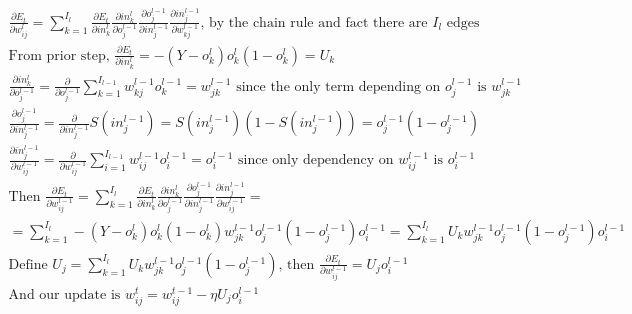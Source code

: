 \documentclass[11pt]{article}
\begin{document}
\begin{gather*}
\frac{\partial E_{t}}{\partial w_{ij}^{l}} = 
\sum_{k = 1}^{I_{l}} 
\frac{\partial E_{t}}{\partial in_{k}^{l}} 
\frac{\partial in_{k}^{l}}{\partial o_{j}^{l - 1}} 
\frac{\partial o_{j}^{l - 1}}{\partial in_{j}^{l - 1}} 
\frac{\partial in_{j}^{l - 1}}{\partial w_{k j}^{l - 1}}
\text{, by the chain rule and fact there are } I_{l} \text{ edges}\\
\text{From prior step, } \frac{\partial E_{t}}{\partial in_{k}^{l}} = 
- (Y - o_{k}^{l}) o_{k}^{l} (1 - o_{k}^{l}) = U_{k}\\
\frac{\partial in_{k}^{l}}{\partial o_{j}^{l - 1}} = 
\frac{\partial}{\partial o_{j}^{l - 1}} 
\sum_{k = 1}^{I_{l - 1}} w_{kj}^{l - 1} o_{k}^{l - 1} = 
w_{j k}^{l - 1} \text{ since the only term depending on } 
o_{j}^{l - 1} \text{ is } w_{j k}^{l - 1}\\
\frac{\partial o_{j}^{l - 1}}{\partial in_{j}^{l - 1}} = 
\frac{\partial}{\partial in_{j}^{l - 1}} S(in_{j}^{l - 1}) = 
S(in_{j}^{l - 1}) (1 - S(in_{j}^{l - 1})) = 
o_{j}^{l - 1} (1 - o_{j}^{l - 1})\\
\frac{\partial in_{j}^{l - 1}}{\partial w_{ij}^{l - 1}} = 
\frac{\partial}{\partial w_{ij}^{l - 1}} 
\sum_{i = 1}^{I_{l - 1}} w_{ij}^{l - 1} o_{i}^{l - 1} = o_{i}^{l - 1} 
\text{ since only dependency on } w_{ij}^{l - 1} 
\text{ is } o_{i}^{l - 1}\\
\text{Then } 
\frac{\partial E_{t}}{\partial w_{i j}^{l - 1}} = 
\sum_{k = 1}^{I_{l}} 
\frac{\partial E_{t}}{\partial in_{k}^{l}} 
\frac{\partial in_{k}^{l}}{\partial o_{j}^{l - 1}} 
\frac{\partial o_{j}^{l - 1}}{\partial in_{j}^{l - 1}} 
\frac{\partial in_{j}^{l - 1}}{\partial w_{i j}^{l - 1}} = \\
= 
\sum_{k = 1}^{I_{l}} 
- (Y - o_{k}^{l}) o_{k}^{l} (1 - o_{k}^{l})
w_{j k}^{l - 1}
o_{j}^{l - 1} (1 - o_{j}^{l - 1}) 
o_{i}^{l - 1} = 
\sum_{k = 1}^{I_{l}} 
U_{k}
w_{j k}^{l - 1}
o_{j}^{l - 1} (1 - o_{j}^{l - 1}) 
o_{i}^{l - 1}\\
\text{Define } U_{j} = 
\sum_{k = 1}^{I_{l}} 
U_{k}
w_{j k}^{l - 1}
o_{j}^{l - 1} (1 - o_{j}^{l - 1}) 
\text{, then } 
\frac{\partial E_{t}}{\partial w_{i j}^{l - 1}} = 
U_{j} o_{i}^{l - 1}\\
\text{And our update is } 
w_{ij}^{t} = w_{ij}^{t - 1} - 
\eta U_{j} o_{i}^{l - 1}
\end{gather*}
\end{document}
